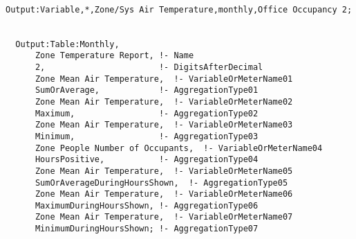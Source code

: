 \begin{lstlisting}

Output:Variable,*,Zone/Sys Air Temperature,monthly,Office Occupancy 2;


  Output:Table:Monthly,
      Zone Temperature Report, !- Name
      2,                       !- DigitsAfterDecimal
      Zone Mean Air Temperature,  !- VariableOrMeterName01
      SumOrAverage,            !- AggregationType01
      Zone Mean Air Temperature,  !- VariableOrMeterName02
      Maximum,                 !- AggregationType02
      Zone Mean Air Temperature,  !- VariableOrMeterName03
      Minimum,                 !- AggregationType03
      Zone People Number of Occupants,  !- VariableOrMeterName04
      HoursPositive,           !- AggregationType04
      Zone Mean Air Temperature,  !- VariableOrMeterName05
      SumOrAverageDuringHoursShown,  !- AggregationType05
      Zone Mean Air Temperature,  !- VariableOrMeterName06
      MaximumDuringHoursShown, !- AggregationType06
      Zone Mean Air Temperature,  !- VariableOrMeterName07
      MinimumDuringHoursShown; !- AggregationType07
\end{lstlisting}
